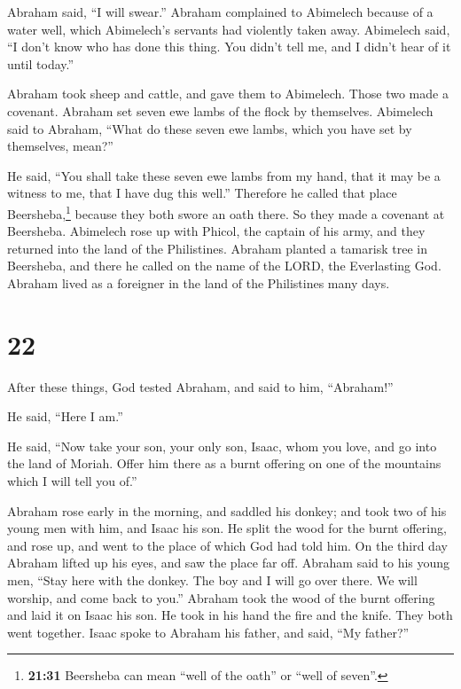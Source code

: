  Abraham said, ``I will swear.''  Abraham
complained to Abimelech because of a water well, which Abimelech's
servants had violently taken away.  Abimelech said, ``I
don't know who has done this thing. You didn't tell me, and I didn't
hear of it until today.''

 Abraham took sheep and cattle, and gave them to
Abimelech. Those two made a covenant.  Abraham set seven
ewe lambs of the flock by themselves.  Abimelech said to
Abraham, ``What do these seven ewe lambs, which you have set by
themselves, mean?''

 He said, ``You shall take these seven ewe lambs from my
hand, that it may be a witness to me, that I have dug this well.''
 Therefore he called that place Beersheba,\footnote{\textbf{21:31}
  Beersheba can mean ``well of the oath'' or ``well of seven''.} because
they both swore an oath there.  So they made a covenant
at Beersheba. Abimelech rose up with Phicol, the captain of his army,
and they returned into the land of the Philistines. 
Abraham planted a tamarisk tree in Beersheba, and there he called on the
name of the LORD, the Everlasting God.  Abraham lived as
a foreigner in the land of the Philistines many days.

\hypertarget{section-21}{%
\section{22}\label{section-21}}

 After these things, God tested Abraham, and said to him,
``Abraham!''

He said, ``Here I am.''

 He said, ``Now take your son, your only son, Isaac, whom
you love, and go into the land of Moriah. Offer him there as a burnt
offering on one of the mountains which I will tell you of.''

 Abraham rose early in the morning, and saddled his
donkey; and took two of his young men with him, and Isaac his son. He
split the wood for the burnt offering, and rose up, and went to the
place of which God had told him.  On the third day Abraham
lifted up his eyes, and saw the place far off.  Abraham
said to his young men, ``Stay here with the donkey. The boy and I will
go over there. We will worship, and come back to you.'' 
Abraham took the wood of the burnt offering and laid it on Isaac his
son. He took in his hand the fire and the knife. They both went
together.  Isaac spoke to Abraham his father, and said,
``My father?''


